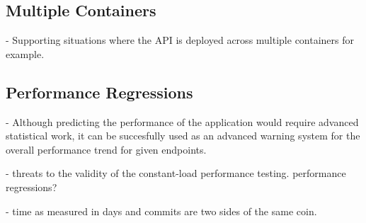



  \subsection*{Multiple Containers}

  -   Supporting situations where the API is deployed across multiple containers for example.


  \subsection*{Performance Regressions}

    - Although predicting the performance of the application would require advanced statistical work, it can be succesfully used as an advanced warning system for the overall performance trend for given endpoints.

    - threats to the validity of the constant-load performance testing. performance regressions? 


    - time as measured in days and commits are two sides of the same coin. 










